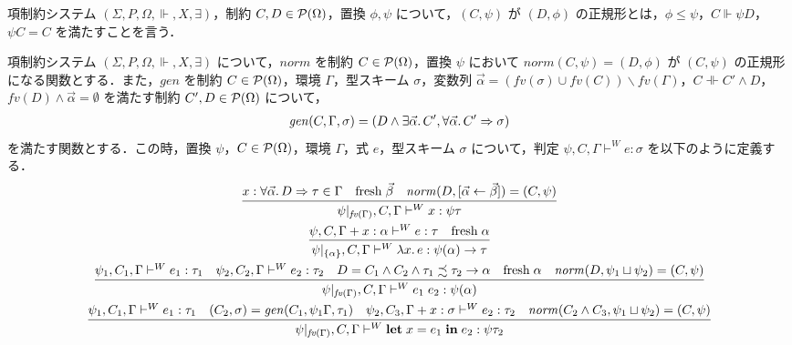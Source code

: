 \begin{definition}[正規形]
  項制約システム $(\Sigma, P, \Omega, \Vdash, X, \exists)$，制約 $C, D \in \mathcal{P}(\Omega)$，置換 $\phi, \psi$ について，$(C, \psi)$ が $(D, \phi)$ の正規形とは，$\phi \leq \psi$，$C \Vdash \psi D$，$\psi C = C$ を満たすことを言う．
\end{definition}

\begin{definition}
  項制約システム $(\Sigma, P, \Omega, \Vdash, X, \exists)$ について，$\mathit{norm}$ を制約 $C \in \mathcal{P}(\Omega)$，置換 $\psi$ において $\mathit{norm}(C, \psi) = (D, \phi)$ が $(C, \psi)$ の正規形になる関数とする．また，$\mathit{gen}$ を制約 $C \in \mathcal{P}(\Omega)$，環境 $\Gamma$，型スキーム $\sigma$，変数列 $\vec{\alpha} = (\mathit{fv}(\sigma) \cup \mathit{fv}(C)) \backslash \mathit{fv}(\Gamma)$，$C \dashVdash C' \land D$，$\mathit{fv}(D) \land \vec{\alpha} = \emptyset$ を満たす制約 $C', D \in \mathcal{P}(\Omega)$ について，
  \begin{align*}
    \mathit{gen}(C, \Gamma, \sigma) = (D \land \exists \vec{\alpha}\ldotp C', \forall \vec{\alpha}\ldotp C' \Rightarrow \sigma)
  \end{align*}
  を満たす関数とする．この時，置換 $\psi$，$C \in \mathcal{P}(\Omega)$，環境 $\Gamma$，式 $e$，型スキーム $\sigma$ について，判定 $\psi, C, \Gamma \vdash^W e: \sigma$ を以下のように定義する．
  \begin{gather*}
    \infer{\psi|_{\mathit{fv}(\Gamma)}, C, \Gamma \vdash^W x: \psi \tau}{
      x: \forall \vec{\alpha}\ldotp D \Rightarrow \tau \in \Gamma
      &
      \mathrm{fresh}\; \vec{\beta}
      &
      \mathit{norm}(D, [\vec{\alpha} \assign \vec{\beta}]) = (C, \psi)
    }
    \\
    \infer{\psi|_{\{\alpha\}}, C, \Gamma \vdash^W \lambda x\ldotp e: \psi(\alpha) \to \tau}{
      \psi, C, \Gamma + x: \alpha \vdash^W e: \tau
      &
      \mathrm{fresh}\; \alpha
    }
    \\
    \infer{\psi|_{\mathit{fv}(\Gamma)}, C, \Gamma \vdash^W e_1\; e_2: \psi(\alpha)}{
      \psi_1, C_1, \Gamma\vdash^W e_1: \tau_1
      &
      \psi_2, C_2, \Gamma\vdash^W e_2: \tau_2
      &
      D = C_1 \land C_2 \land \tau_1 \precsim \tau_2 \to \alpha
      &
      \mathrm{fresh}\; \alpha
      &
      \mathit{norm}(D, \psi_1 \sqcup \psi_2) = (C, \psi)
    }
    \\
    \infer{\psi|_{\mathit{fv}(\Gamma)}, C, \Gamma \vdash^W \mathbf{let}\; x = e_1\; \mathbf{in}\; e_2: \psi\tau_2}{
      \psi_1, C_1, \Gamma\vdash^W e_1: \tau_1
      &
      (C_2, \sigma) = \mathit{gen}(C_1, \psi_1\Gamma, \tau_1)
      &
      \psi_2, C_3, \Gamma + x:\sigma \vdash^W e_2: \tau_2
      &
      \mathit{norm}(C_2 \land C_3, \psi_1 \sqcup \psi_2) = (C, \psi)
    }
  \end{gather*}
\end{definition}

